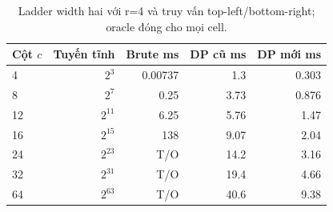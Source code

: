 \begin{table}[htbp]
\centering
\small
\setlength{\tabcolsep}{4pt}
\caption{Ladder width hai với r=4 và truy vấn top-left/bottom-right; oracle đóng cho mọi cell.}
\label{tab:ladder}
\begin{tabular}{lrrrr}
\toprule
Cột $c$ & Tuyến tĩnh & Brute ms & DP cũ ms & DP mới ms \\
\midrule
4 & $2^{3}$ & 0.00737 & 1.3 & 0.303 \\
8 & $2^{7}$ & 0.25 & 3.73 & 0.876 \\
12 & $2^{11}$ & 6.25 & 5.76 & 1.47 \\
16 & $2^{15}$ & 138 & 9.07 & 2.04 \\
24 & $2^{23}$ & T/O & 14.2 & 3.16 \\
32 & $2^{31}$ & T/O & 19.4 & 4.66 \\
64 & $2^{63}$ & T/O & 40.6 & 9.38 \\
\bottomrule
\end{tabular}
\end{table}
